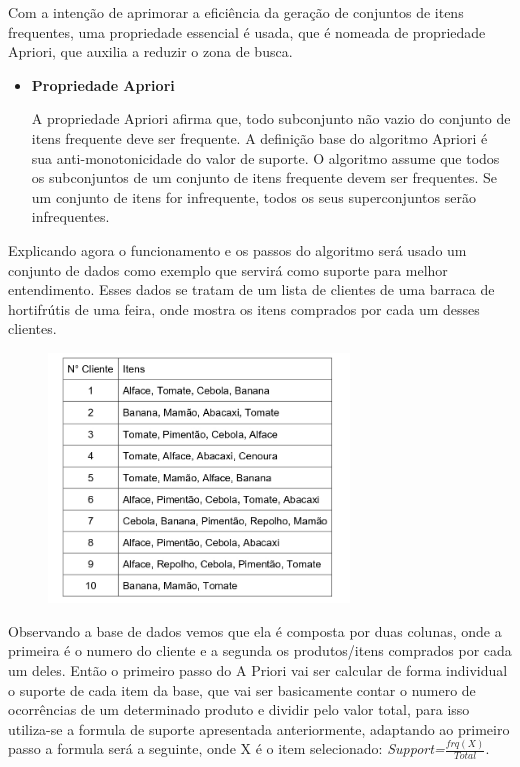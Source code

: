 \documentclass[tcc1]{uftex}
\begin{document}
Com a intenção de aprimorar a eficiência da geração de conjuntos de itens frequentes, uma propriedade essencial é usada, que é nomeada de propriedade Apriori, que auxilia a reduzir o zona de busca.


 \begin{itemize}
 \setlength{\parindent}{1.25cm}
 \item\textbf{Propriedade Apriori}
  
  A propriedade Apriori afirma que, todo subconjunto não vazio do conjunto de itens frequente deve ser frequente. A definição base do algoritmo Apriori é sua anti-monotonicidade do valor de suporte. O algoritmo assume que todos os subconjuntos de um conjunto de itens frequente devem ser frequentes. Se um conjunto de itens for infrequente, todos os seus superconjuntos serão infrequentes.
 
 \end{itemize}

Explicando agora o funcionamento e os passos do algoritmo será usado um conjunto de dados como exemplo que servirá como suporte para melhor entendimento. Esses dados se tratam de um lista de clientes de uma barraca de hortifrútis de uma feira, onde mostra os itens comprados por cada um desses clientes. 
    \begin{figure}[h]
    \centering
    \includegraphics[width=8cm]{tabela de clientes.jpg}
    \end{figure}
    
Observando a base de dados vemos que ela é composta por duas colunas, onde a primeira é o numero do cliente e a segunda os produtos/itens comprados por cada um deles. Então o primeiro passo do A Priori vai ser calcular de forma individual o suporte de cada item da base, que vai ser basicamente contar o numero de ocorrências de um determinado produto e dividir pelo valor total, para isso utiliza-se a formula de suporte apresentada anteriormente, adaptando ao primeiro passo a formula será a seguinte, onde X é o item selecionado: \textit{Support=}${\frac{frq(X)}{Total}}$.
    
\end{document}

